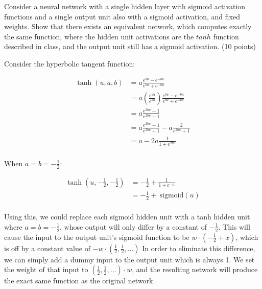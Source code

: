 \documentclass[fleqn]{homework}
\newcommand{\sigmoid}{\:\text{sigmoid}}
\begin{document}
  \begin{problem}{2}
    \begin{question}
      Consider a neural network with a single hidden layer with sigmoid
      activation functions and a single output unit also with a sigmoid
      activation, and fixed weights. Show that there exists an equivalent
      network, which computes exactly the same function, where the hidden unit
      activations are the $tanh$ function described in class, and the output
      unit still has a sigmoid activation. (10 points)
    \end{question}

    Consider the hyperbolic tangent function:

    \begin{align*}
      \tanh(u, a, b) &= a\frac{e^{bu} - e^{-bu}}{e^{bu} + e^{-bu}} \\
                     &= a\left(\frac{e^{bu}}{e^{bu}}\right) \frac{e^{bu} - e^{-bu}}{e^{bu} + e^{-bu}} \\
                     &= a\frac{e^{2bu} - 1}{e^{2bu} + 1} \\
                     &= a\frac{e^{2bu} + 1}{e^{2bu} + 1} - a\frac{2}{e^{2bu} + 1} \\
                     &= a - 2 a\frac{1}{1 + e^{2bu}} \\
    \end{align*}

    When $a = b = -\frac{1}{2}$:

    \begin{align*}
      \tanh\left(u, -\frac{1}{2}, -\frac{1}{2}\right)
      &= -\frac{1}{2} + \frac{1}{1 + e^{-u}} \\
      &= -\frac{1}{2} + \sigmoid(u) \\
    \end{align*}

    Using this, we could replace each sigmoid hidden unit with a tanh hidden
    unit where $a = b = -\frac{1}{2}$, whose output will only differ by a
    constant of $-\frac{1}{2}$.  This will cause the input to the output unit's
    sigmoid function to be $w \cdot (-\frac{1}{2} + x)$, which is off by a
    constant value of $-w \cdot (\frac{1}{2}, \frac{1}{2}, ...)$ In order to
    eliminate this difference, we can simply add a dummy input to the output
    unit which is always 1.  We set the weight of that input to
    $(\frac{1}{2}, \frac{1}{2}, \dots) \cdot w$, and the resulting network will
    produce the exact same function as the original network.
  \end{problem}
\end{document}
